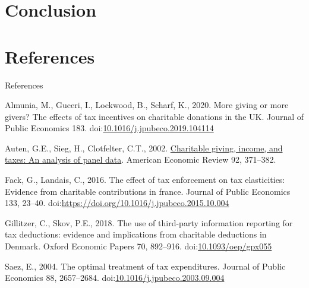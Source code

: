 \documentclass[
  ignorenonframetext,
  aspectratio=169,
]{beamer}
\newlength{\cslhangindent}
\newlength{\cslentryspacingunit} %
\newenvironment{CSLReferences}[2] %
 {%
  \setlength{\parindent}{0pt}
  \ifodd #1
  \let\oldpar\par
  \def\par{\hangindent=\cslhangindent\oldpar}
  \fi
  \setlength{\parskip}{#2\cslentryspacingunit}
 }%
 {}
\begin{document}
\hypertarget{conclusion}{%
\section{Conclusion}\label{conclusion}}

\hypertarget{references}{%
\section*{References}\label{references}}

\begin{frame}{References}
\hypertarget{refs}{}
\begin{CSLReferences}{1}{0}
\leavevmode{}%
Almunia, M., Guceri, I., Lockwood, B., Scharf, K., 2020. More giving or more givers? The effects of tax incentives on charitable donations in the UK. Journal of Public Economics 183. doi:\href{https://doi.org/10.1016/j.jpubeco.2019.104114}{10.1016/j.jpubeco.2019.104114}

\leavevmode{}%
Auten, G.E., Sieg, H., Clotfelter, C.T., 2002. \href{http://www.jstor.org/stable/3083340}{Charitable giving, income, and taxes: An analysis of panel data}. American Economic Review 92, 371--382.

\leavevmode{}%
Fack, G., Landais, C., 2016. The effect of tax enforcement on tax elasticities: Evidence from charitable contributions in france. Journal of Public Economics 133, 23--40. doi:\url{https://doi.org/10.1016/j.jpubeco.2015.10.004}

\leavevmode{}%
Gillitzer, C., Skov, P.E., 2018. {The use of third-party information reporting for tax deductions: evidence and implications from charitable deductions in Denmark}. Oxford Economic Papers 70, 892--916. doi:\href{https://doi.org/10.1093/oep/gpx055}{10.1093/oep/gpx055}

\leavevmode{}%
Saez, E., 2004. The optimal treatment of tax expenditures. Journal of Public Economics 88, 2657--2684. doi:\href{https://doi.org/10.1016/j.jpubeco.2003.09.004}{10.1016/j.jpubeco.2003.09.004}

\end{CSLReferences}
\end{frame}
\end{document}

